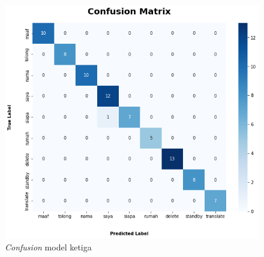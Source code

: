 \begin{figure}[H]
  \centering

  \includegraphics[scale=0.6]{gambar/bab4-uji-model-best-cf.png}

  \caption{\emph{Confusion} model ketiga}
  \label{fig:model3-cf}
\end{figure}

